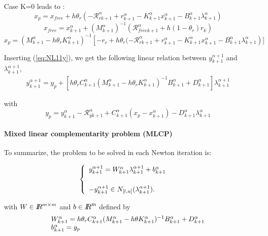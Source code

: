 Case K=0 leads to :
\[ x_p = x_{free} + h \theta _r( -\mathcal  R_{rk+1}^{\alpha} +  r^{\alpha}_{k+1} -K^{\alpha}_{k+1} x^{\alpha}_{k+1}-
      B^{\alpha}_{k+1} \lambda^{\alpha}_{k+1} ) \]
\[
      x_{free}=x^{\alpha}_{k+1} + (M^{\alpha}_{k+1})^{-1}(
      \mathcal R _{free k+1} ^{\alpha} +h(1-\theta _r)r_k)\]
\begin{equation}
x_p =  (M^{\alpha}_{k+1} -h \theta _r K^{\alpha}_{k+1})^{-1}  \left[ -r_c + h \theta _r( -\mathcal
      R_{rk+1}^{\alpha} +  r^{\alpha}_{k+1} -K^{\alpha}_{k+1} x^{\alpha}_{k+1}-
      B^{\alpha}_{k+1} \lambda^{\alpha}_{k+1} \right)]
  \end{equation}

Inserting (\ref{eq:NL11y}), we get the following linear relation between $y^{\alpha+1}_{k+1}$ and $\lambda^{\alpha+1}_{k+1}$, 
\begin{equation}
   \begin{array}{l}
 y^{\alpha+1}_{k+1} = y_p + \left[ h \theta _r C^{\alpha}_{k+1} (M^{\alpha}_{k+1}- h \theta _r
 K^{\alpha}_{k+1})^{-1}  B^{\alpha}_{k+1} + D^{\alpha}_{k+1} \right]\lambda^{\alpha+1}_{k+1}
   \end{array}
\end{equation}

with 
\begin{equation}
y_p = y^{\alpha}_{k+1} -\mathcal R^{\alpha}_{yk+1} + C^{\alpha}_{k+1}(x_p -x^{\alpha}_{k+1}) -
D^{\alpha}_{k+1} \lambda^{\alpha}_{k+1} 
\end{equation}

\paragraph{Mixed linear complementarity problem (MLCP)}To summarize, the problem to be solved in each Newton iteration is:\\{
  \begin{minipage}[l]{1.0\linewidth}
    \begin{equation}
      \begin{cases}
      \begin{array}[l]{l}
        y^{\alpha+1}_{k+1} =   W^{\alpha}_{k+1}  \lambda^{\alpha+1}_{k+1} + b^{\alpha}_{k+1}
        \\ \\
        -y^{\alpha+1}_{k+1} \in N_{[l,u]}(\lambda^{\alpha+1}_{k+1} ). 
      \end{array}
      \label{eq:NL14}
      \end{cases}
    \end{equation}
  \end{minipage}
}
with $W\in \mbox{\rm $I\!\!R$}^{m\times m}$ and $b\in\mbox{\rm $I\!\!R$}^{m}$ defined by
\begin{equation}
  \label{eq:NL15}
 \begin{array}[l]{l}
   W^{\alpha}_{k+1} = h \theta _r C^{\alpha}_{k+1} (M^{\alpha}_{k+1}- h \theta
 K^{\alpha}_{k+1})^{-1}  B^{\alpha}_{k+1} + D^{\alpha}_{k+1} \\
   b^{\alpha}_{k+1} = y_p
\end{array}
\end{equation}

